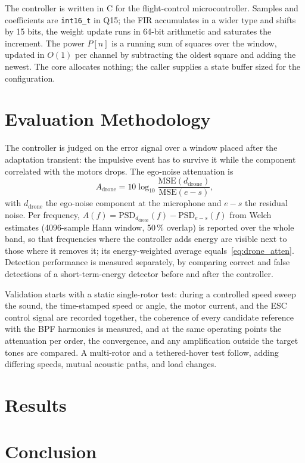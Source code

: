 \documentclass[conference]{IEEEtran}
\begin{document}
The controller is written in C for the flight-control microcontroller. Samples and coefficients are \texttt{int16\_t} in Q15; the FIR accumulates in a wider type and shifts by 15 bits, the weight update runs in 64-bit arithmetic and saturates the increment. The power $P[n]$ is a running sum of squares over the window, updated in $O(1)$ per channel by subtracting the oldest square and adding the newest. The core allocates nothing; the caller supplies a state buffer sized for the configuration.

\section{Evaluation Methodology}
\label{sec:setup}
The controller is judged on the error signal over a window placed after the adaptation transient: the impulsive event has to survive it while the component correlated with the motors drops. The ego-noise attenuation is
\begin{equation}
  A_{\mathrm{drone}} = 10\log_{10}\frac{\mathrm{MSE}(d_{\mathrm{drone}})}{\mathrm{MSE}(e-s)},
  \label{eq:drone_atten}
\end{equation}
with $d_{\mathrm{drone}}$ the ego-noise component at the microphone and $e-s$ the residual noise. Per frequency, $A(f)=\mathrm{PSD}_{d_{\mathrm{drone}}}(f)-\mathrm{PSD}_{e-s}(f)$ from Welch estimates (4096-sample Hann window, 50\,\% overlap) is reported over the whole band, so that frequencies where the controller adds energy are visible next to those where it removes it; its energy-weighted average equals~\eqref{eq:drone_atten}. Detection performance is measured separately, by comparing correct and false detections of a short-term-energy detector before and after the controller.

Validation starts with a static single-rotor test: during a controlled speed sweep the sound, the time-stamped speed or angle, the motor current, and the ESC control signal are recorded together, the coherence of every candidate reference with the BPF harmonics is measured, and at the same operating points the attenuation per order, the convergence, and any amplification outside the target tones are compared. A multi-rotor and a tethered-hover test follow, adding differing speeds, mutual acoustic paths, and load changes.

\section{Results}
\label{sec:results}

\section{Conclusion}
\label{sec:conclusion}



\end{document}
